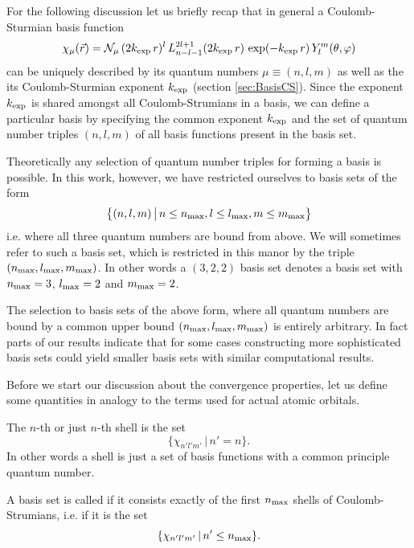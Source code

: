 \newcommand{\nmax}{\ensuremath n_\text{max}}
\newcommand{\lmax}{\ensuremath l_\text{max}}
\newcommand{\mmax}{\ensuremath m_\text{max}}
For the following discussion let us briefly recap
that in general a Coulomb-Sturmian basis function
\begin{equation}
\chi_\mu(\vec{r}) = \mathcal{N}_\mu \,
	(2 k_\text{exp} \, r)^l \,
	L^{2l+1}_{n-l-1}(2 k_\text{exp} \, r) \,
	\exp(- k_\text{exp} \, r) \,
	Y_l^m(\theta, \varphi)
	\label{eqn:FormCSBasisFunction}
\end{equation}
can be uniquely described by its quantum numbers $\mu \equiv (n,l,m)$
as well as the its Coulomb-Sturmian exponent $k_\text{exp}$ (\cf section \vref{sec:BasisCS}).
Since the exponent $k_\text{exp}$ is shared amongst all Coulomb-Strumians in a basis,
we can define a particular \CS basis
by specifying the common exponent $k_\text{exp}$
and the set of quantum number triples $(n, l, m)$ of all \CS basis functions
present in the basis set.

Theoretically any selection of quantum number triples for forming a basis
is possible.
In this work, however, we have restricted ourselves to basis sets of the form
\[ \big\{ (n, l, m) \, \big| \, n \le \nmax, l \le \lmax, m \le \mmax \big\} \]
i.e. where all three quantum numbers are bound from above.
We will sometimes refer to such a \CS basis set, which is restricted in this
manor by the triple $(\nmax, \lmax, \mmax)$.
In other words a $(3,2,2)$ basis set denotes a basis set with
$\nmax = 3$, $\lmax = 2$ and $\mmax = 2$.

The selection to basis sets of the above form,
where all quantum numbers are bound by a common upper bound $(\nmax, \lmax, \mmax)$
is entirely arbitrary.
In fact parts of our results indicate that for some cases
constructing more sophisticated basis sets could yield
smaller basis sets with similar computational results.

Before we start our discussion about the \CS convergence properties,
let us define some quantities in analogy to the terms used for actual atomic orbitals.

\begin{defn} The $n$-th  or just $n$-th shell
	is the set
	\[ \{ \chi_{n'l'm'} \, | \, n' = n \}. \]
	In other words a shell is just a set of \CS basis functions with a common
	principle quantum number.
\end{defn}

\begin{defn}
	A \CS basis set is called  if it consists exactly of the
	first $\nmax$ shells of Coulomb-Strumians, i.e. if it is the set
	\[ \{ \chi_{n'l'm'} \, | \, n' \leq \nmax \}. \]
\end{defn}

